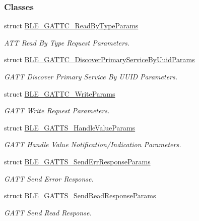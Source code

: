 \subsubsection*{Classes}
\begin{DoxyCompactItemize}
\item 
struct \hyperlink{struct_b_l_e___g_a_t_t_c___read_by_type_params}{B\+L\+E\+\_\+\+G\+A\+T\+T\+C\+\_\+\+Read\+By\+Type\+Params}
\begin{DoxyCompactList}\small\item\em A\+TT Read By Type Request Parameters. \end{DoxyCompactList}\item 
struct \hyperlink{struct_b_l_e___g_a_t_t_c___discover_primary_service_by_uuid_params}{B\+L\+E\+\_\+\+G\+A\+T\+T\+C\+\_\+\+Discover\+Primary\+Service\+By\+Uuid\+Params}
\begin{DoxyCompactList}\small\item\em G\+A\+TT Discover Primary Service By U\+U\+ID Parameters. \end{DoxyCompactList}\item 
struct \hyperlink{struct_b_l_e___g_a_t_t_c___write_params}{B\+L\+E\+\_\+\+G\+A\+T\+T\+C\+\_\+\+Write\+Params}
\begin{DoxyCompactList}\small\item\em G\+A\+TT Write Request Parameters. \end{DoxyCompactList}\item 
struct \hyperlink{struct_b_l_e___g_a_t_t_s___handle_value_params}{B\+L\+E\+\_\+\+G\+A\+T\+T\+S\+\_\+\+Handle\+Value\+Params}
\begin{DoxyCompactList}\small\item\em G\+A\+TT Handle Value Notification/\+Indication Parameters. \end{DoxyCompactList}\item 
struct \hyperlink{struct_b_l_e___g_a_t_t_s___send_err_response_params}{B\+L\+E\+\_\+\+G\+A\+T\+T\+S\+\_\+\+Send\+Err\+Response\+Params}
\begin{DoxyCompactList}\small\item\em G\+A\+TT Send Error Response. \end{DoxyCompactList}\item 
struct \hyperlink{struct_b_l_e___g_a_t_t_s___send_read_response_params}{B\+L\+E\+\_\+\+G\+A\+T\+T\+S\+\_\+\+Send\+Read\+Response\+Params}
\begin{DoxyCompactList}\small\item\em G\+A\+TT Send Read Response. \end{DoxyCompactList}\item 

\end{DoxyCompactItemize}
